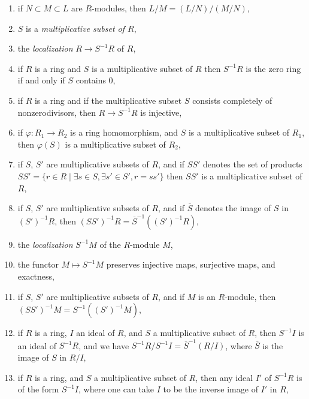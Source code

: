 \begin{enumerate}
\item if $N \subset M \subset L$ are $R$-modules, then $L/M = (L/N)/(M/N)$,
\label{item-isomorphism-theorem}
\item $S$ is a {\it multiplicative subset of $R$},
\label{item-multiplicative-subset}
\item the {\it localization} $R \to S^{-1}R$ of $R$,
\label{item-localization-ring}
\item
\label{item-localization-zero}
if $R$ is a ring and $S$ is a multiplicative subset
of $R$ then $S^{-1}R$ is the zero ring if and only if $S$ contains $0$,
\item
\label{item-localize-nonzerodivisors}
if $R$ is a ring and if the multiplicative subset $S$
consists completely of nonzerodivisors, then $R \to S^{-1}R$
is injective,
\item if $\varphi : R_1 \to R_2$ is a ring homomorphism, and
$S$ is a multiplicative subset of $R_1$, then $\varphi(S)$ is
a multiplicative subset of $R_2$,
\item
\label{item-products-multiplicative-subsets}
if $S$, $S'$ are multiplicative subsets of $R$,
and if $SS'$ denotes the set of products $SS' =
\{r \in R \mid \exists s\in S, \exists s' \in S', r = ss'\}$
then $SS'$ is a multiplicative subset of $R$,
\item
\label{item-localization-localization}
if $S$, $S'$ are multiplicative subsets of $R$,
and if $\overline{S}$ denotes the image of $S$ in $(S')^{-1}R$,
then $(SS')^{-1}R = \overline{S}^{-1}((S')^{-1}R)$,
\item the {\it localization} $S^{-1}M$ of the $R$-module $M$,
\label{item-localization-module}
\item
\label{item-localization-exact}
the functor $M \mapsto S^{-1}M$ preserves injective maps,
surjective maps, and exactness,
\item
\label{item-localization-localization-module}
if $S$, $S'$ are multiplicative subsets of $R$,
and if $M$ is an $R$-module, then
$(SS')^{-1}M = S^{-1}((S')^{-1}M)$,
\item
\label{item-localize-ideal}
if $R$ is a ring, $I$ an ideal of $R$, and $S$ a multiplicative
subset of $R$, then $S^{-1}I$ is an ideal of $S^{-1}R$, and we have
$S^{-1}R/S^{-1}I = \overline{S}^{-1}(R/I)$, where $\overline{S}$
is the image of $S$ in $R/I$,
\item
\label{item-ideal-in-localization}
if $R$ is a ring, and $S$ a multiplicative
subset of $R$, then any ideal $I'$ of $S^{-1}R$ is
of the form $S^{-1}I$, where one can take $I$ to be
the inverse image of $I'$ in $R$,

\end{enumerate}
